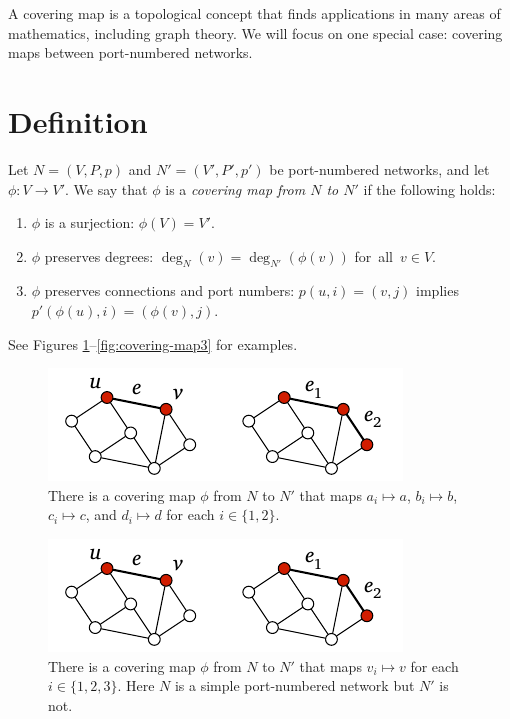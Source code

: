 
A covering map is a topological concept that finds applications in many areas of mathematics, including graph theory. We will focus on one special case: covering maps between port-numbered networks.

\section{Definition}

Let $N = (V,P,p)$ and $N' = (V'\!,P'\!,p')$ be port-numbered networks, and let $\phi \colon V \to V'$. We say that $\phi$ is a \emph{covering map from $N$ to $N'$} if the following holds:
\begin{enumerate}\raggedright
    \item $\phi$ is a surjection: $\phi(V) = V'$.
    \item $\phi$ preserves degrees: $\deg_{N}(v) = \deg_{N'}(\phi(v))$ for~all~$v \in V$.
    \item $\phi$ preserves connections and port numbers: $p(u,i) = (v,j)$ implies $p'(\phi(u),i) = (\phi(v),j)$.
\end{enumerate}
See Figures \ref{fig:covering-map}--\ref{fig:covering-map3} for examples.

\begin{figure}
    \centering
    \includegraphics[page=\PCoveringMap]{figs.pdf}
    \caption{There is a covering map $\phi$ from $N$ to $N'$ that maps $a_i \mapsto a$, $b_i \mapsto b$, $c_i \mapsto c$, and $d_i \mapsto d$ for each $i \in \{1, 2\}$.}\label{fig:covering-map}
\end{figure}

\begin{figure}
    \centering
    \includegraphics[page=\PCoveringMapB]{figs.pdf}
    \caption{There is a covering map $\phi$ from $N$ to $N'$ that maps $v_i \mapsto v$ for each $i \in \{1, 2, 3\}$. Here $N$ is a simple port-numbered network but $N'$ is not.}\label{fig:covering-map2}
\end{figure}

